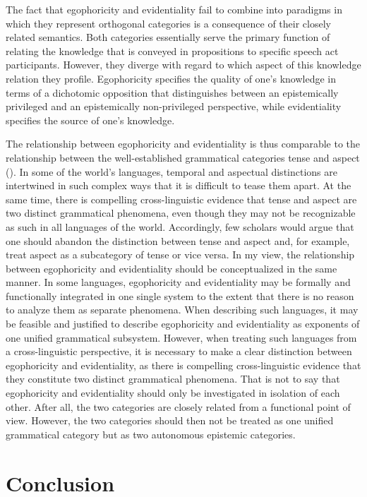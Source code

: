 \documentclass[output=paper]{langsci/langscibook}
\begin{document}
The fact that egophoricity and evidentiality fail to combine into paradigms in which they represent orthogonal categories is a consequence of their closely related semantics. Both categories essentially serve the primary function of relating the knowledge that is conveyed in propositions to specific speech act participants. However, they diverge with regard to which aspect of this knowledge relation they profile. Egophoricity specifies the quality of one’s knowledge in terms of a dichotomic opposition that distinguishes between an epistemically privileged and an epistemically non-privileged perspective, while evidentiality specifies the source of one’s knowledge. 

The relationship between egophoricity and evidentiality is thus comparable to the relationship between the well-established grammatical categories tense and aspect (\citealt[299]{Widmer2017b}). In some of the world’s languages, temporal and aspectual distinctions are intertwined in such complex ways that it is difficult to tease them apart. At the same time, there is compelling cross-linguistic evidence that tense and aspect are two distinct grammatical phenomena, even though they may not be recognizable as such in all languages of the world. Accordingly, few scholars would argue that one should abandon the distinction between tense and aspect and, for example, treat aspect as a subcategory of tense or vice versa. In my view, the relationship between egophoricity and evidentiality should be conceptualized in the same manner. In some languages, egophoricity and evidentiality may be formally and functionally integrated in one single system to the extent that there is no reason to analyze them as separate phenomena. When describing such languages, it may be feasible and justified to describe egophoricity and evidentiality as exponents of one unified grammatical subsystem. However, when treating such languages from a cross-linguistic perspective, it is necessary to make a clear distinction between egophoricity and evidentiality, as there is compelling cross-linguistic evidence that they constitute two distinct grammatical phenomena. That is not to say that egophoricity and evidentiality should only be investigated in isolation of each other. After all, the two categories are closely related from a functional point of view. However, the two categories should then not be treated as one unified grammatical category but as two autonomous epistemic categories.

\section{Conclusion}\label{s:mw6}
\end{document}
